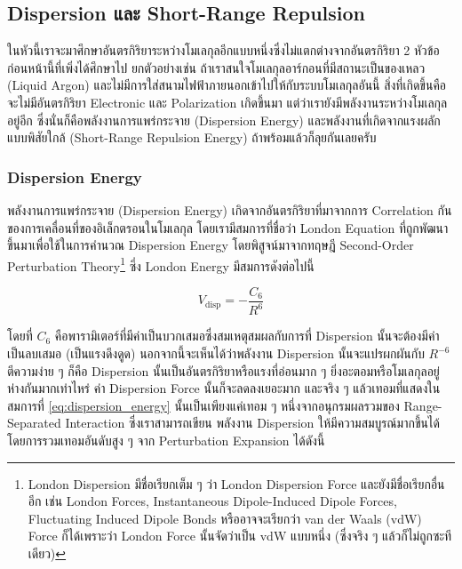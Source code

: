 \subsection{Dispersion และ Short-Range Repulsion}

ในหัวนี้เราจะมาศึกษาอันตรกิริยาระหว่างโมเลกุลอีกแบบหนึ่งซึ่งไม่แตกต่างจากอันตรกิริยา 2 หัวข้อก่อนหน้านี้ที่เพิ่งได้ศึกษาไป ยกตัวอย่างเช่น
ถ้าเราสนใจโมเลกุลอาร์กอนที่มีสถานะเป็นของเหลว (Liquid Argon) และไม่มีการใส่สนามไฟฟ้าภายนอกเข้าไปให้กับระบบโมเลกุลอันนี้
สิ่งที่เกิดขึ้นคือจะไม่มีอันตรกิริยา Electronic และ Polarization เกิดขึ้นมา แต่ว่าเรายังมีพลังงานระหว่างโมเลกุลอยู่อีก
ซึ่งนั่นก็คือพลังงานการแพร่กระจาย (Dispersion Energy) และพลังงานที่เกิดจากแรงผลักแบบพิสัยใกล้ (Short-Range Repulsion Energy)
ถ้าพร้อมแล้วก็ลุยกันเลยครับ

\subsubsection{Dispersion Energy}

พลังงานการแพร่กระจาย (Dispersion Energy) เกิดจากอันตรกิริยาที่มาจากการ Correlation กันของการเคลื่อนที่ของอิเล็กตรอนในโมเลกุล
โดยเรามีสมการที่ชื่อว่า London Equation ที่ถูกพัฒนาขึ้นมาเพื่อใช้ในการคำนวณ Dispersion Energy โดยพิสูจน์มาจากทฤษฎี Second-Order
Perturbation Theory\footnote{London Dispersion มีชื่อเรียกเต็ม ๆ ว่า London Dispersion Force และยังมีชื่อเรียกอื่นอีก เช่น
  London Forces, Instantaneous Dipole-Induced Dipole Forces, Fluctuating Induced Dipole Bonds หรืออาจจะเรียกว่า
  van der Waals (vdW) Force ก็ได้เพราะว่า London Force นั้นจัดว่าเป็น vdW แบบหนึ่ง (ซึ่งจริง ๆ แล้วก็ไม่ถูกซะทีเดียว)}
ซึ่ง London Energy มีสมการดังต่อไปนี้\autocite{eisenschitz1930,london1930,london1937}

\begin{equation}
  \label{eq:dispersion_energy}
  V_{\text{disp}}
  =
  - \frac{C_{6}}{R^{6}}
\end{equation}

\noindent โดยที่ $C_{6}$ คือพารามิเตอร์ที่มีค่าเป็นบวกเสมอซึ่งสมเหตุสมผลกับการที่ Dispersion นั้นจะต้องมีค่าเป็นลบเสมอ (เป็นแรงดึงดูด)
นอกจากนี้จะเห็นได้ว่าพลังงาน Dispersion นั้นจะแปรผกผันกับ $R^{-6}$ ตีความง่าย ๆ ก็คือ Dispersion นั้นเป็นอันตรกิริยาหรือแรงที่อ่อนมาก ๆ
ยิ่งอะตอมหรือโมเลกุลอยู่ห่างกันมากเท่าไหร่ ค่า Dispersion Force นั้นก็จะลดลงเยอะมาก และจริง ๆ แล้วเทอมที่แสดงในสมการที่
\eqref{eq:dispersion_energy} นั้นเป็นเพียงแค่เทอม ๆ หนึ่งจากอนุกรมผลรวมของ Range-Separated Interaction ซึ่งเราสามารถเขียน%
พลังงาน Dispersion ให้มีความสมบูรณ์มากขึ้นได้โดยการรวมเทอมอันดับสูง ๆ จาก Perturbation Expansion ได้ดังนี้

